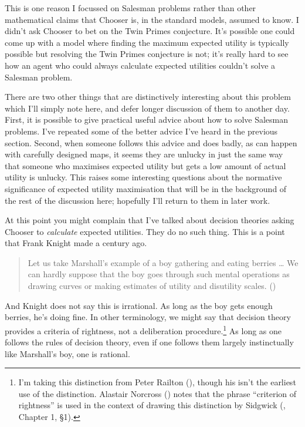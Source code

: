 \documentclass[
  12pt,
  letterpaper,
  DIV=11,
  numbers=noendperiod,
  twoside]{scrartcl}
\begin{document}
This is one reason I focussed on Salesman problems rather than other
mathematical claims that Chooser is, in the standard models, assumed to
know. I didn't ask Chooser to bet on the Twin Primes conjecture. It's
possible one could come up with a model where finding the maximum
expected utility is typically possible but resolving the Twin Primes
conjecture is not; it's really hard to see how an agent who could always
calculate expected utilities couldn't solve a Salesman problem.

There are two other things that are distinctively interesting about this
problem which I'll simply note here, and defer longer discussion of them
to another day. First, it is possible to give practical useful advice
about how to solve Salesman problems. I've repeated some of the better
advice I've heard in the previous section. Second, when someone follows
this advice and does badly, as can happen with carefully designed maps,
it seems they are unlucky in just the same way that someone who
maximises expected utility but gets a low amount of actual utility is
unlucky. This raises some interesting questions about the normative
significance of expected utility maximisation that will be in the
background of the rest of the discussion here; hopefully I'll return to
them in later work.

At this point you might complain that I've talked about decision
theories asking Chooser to \emph{calculate} expected utilities. They do
no such thing. This is a point that Frank Knight made a century ago.

\begin{quote}
Let us take Marshall's example of a boy gathering and eating berries
\ldots{} We can hardly suppose that the boy goes through such mental
operations as drawing curves or making estimates of utility and
disutility scales. ()
\end{quote}

And Knight does not say this is irrational. As long as the boy gets
enough berries, he's doing fine. In other terminology, we might say that
decision theory provides a criteria of rightness, not a deliberation
procedure.\footnote{I'm taking this distinction from Peter Railton
  (), though his isn't the earliest use
  of the distinction. Alastair Norcross
  () notes that the phrase ``criterion
  of rightness'' is used in the context of drawing this distinction by
  Sidgwick (, Chapter 1, §1).}
As long as one follows the rules of decision theory, even if one follows
them largely instinctually like Marshall's boy, one is rational.
\end{document}
